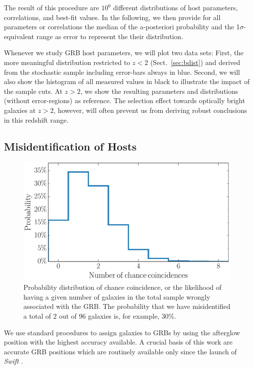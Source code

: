 \documentclass[traditabstract, longauth]{aa}
\begin{document}
 {The result of this procedure are $10^{6}$ different distributions of host parameters, correlations, and best-fit values. In the following, we then provide for all parameters or correlations the median of the a-posteriori probability and the 1$\sigma$-equivalent range as error to represent the their distribution.}

 {Whenever we study GRB host parameters, we will plot two data sets: First, the more meaningful distribution restricted to $z<2$ (Sect.~\ref{sec:bdist}) and derived from the stochastic sample including error-bars always in blue. Second, we will also show the histogram of all measured values in black to illustrate the impact of the sample cuts. At $z>2$, we show the resulting parameters and distributions (without error-regions) as reference. The selection effect towards optically bright galaxies at $z>2$, however, will often prevent us from deriving robust conclusions in this redshift range.}

\subsection{Misidentification of Hosts}

\begin{figure}
\includegraphics[angle=0, width=0.99\columnwidth]{Figs/Misidentifications.pdf}
\caption{Probability distribution of chance coincidence, or the likelihood of having a given number of galaxies in the total sample wrongly associated with the GRB. The probability that we have misidentified a total of 2 out of 96 galaxies is, for example, 30\%.}
\label{fig:misid}
\end{figure}

We use standard procedures \citep{2002AJ....123.1111B, 2009AJ....138.1690P} to assign galaxies to GRBs by using the afterglow position with the highest accuracy available. A crucial basis of this work are accurate GRB positions which are routinely available only since the launch of \textit{Swift} \citep{2004ApJ...611.1005G, 2005SSRv..120..165B}. 
\end{document}
